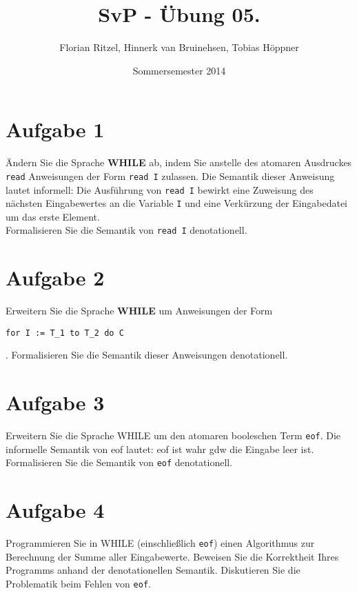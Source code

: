 \documentclass[ngerman,a4paper]{report}
\author{Florian Ritzel, Hinnerk van Bruinehsen, Tobias Höppner}
\title{SvP - Übung 05. }
\date{Sommersemester 2014}
\renewcommand{\maketitle}{}
\begin{document}
\maketitle
\section*{Aufgabe 1}
Ändern Sie die Sprache \textbf{WHILE} ab, indem Sie anstelle des atomaren Ausdruckes \lstinline!read! Anweisungen der Form \lstinline!read I! zulassen. Die Semantik dieser Anweisung lautet informell: Die Ausführung von \lstinline!read I! bewirkt eine Zuweisung des nächsten Eingabewertes an die Variable \lstinline!I! und eine Verkürzung der Eingabedatei um das erste Element.\\
Formalisieren Sie die Semantik von \lstinline!read I! denotationell.\\
\section*{Aufgabe 2}
Erweitern Sie die Sprache \textbf{WHILE} um Anweisungen der Form 
\begin{lstlisting}
for I := T_1 to T_2 do C
\end{lstlisting}.
Formalisieren Sie die Semantik dieser Anweisungen denotationell.\\
\section*{Aufgabe 3}
Erweitern Sie die Sprache WHILE um den atomaren booleschen Term \lstinline!eof!. Die informelle Semantik von eof lautet: eof ist wahr gdw die Eingabe leer ist.\\
Formalisieren Sie die Semantik von \lstinline!eof! denotationell.\\
\section*{Aufgabe 4}
Programmieren Sie in WHILE (einschließlich \lstinline!eof!) einen Algorithmus zur Berechnung der Summe aller Eingabewerte. Beweisen Sie die Korrektheit Ihres Programms anhand der denotationellen Semantik. Diskutieren Sie die Problematik beim Fehlen von \lstinline!eof!.
\end{document}
